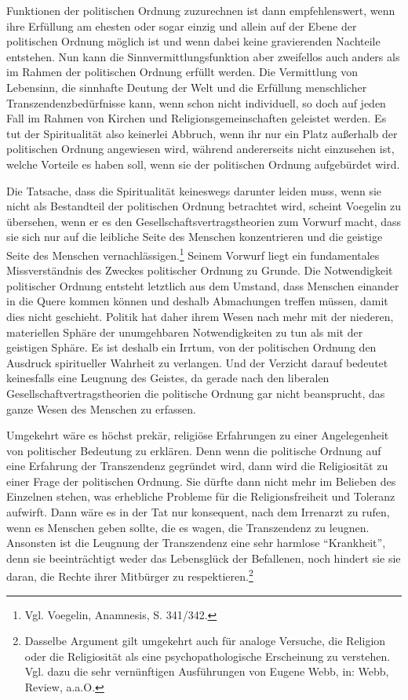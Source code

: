 Funktionen der politischen Ordnung zuzurechnen ist dann empfehlenswert, wenn
ihre Erfüllung am ehesten oder sogar einzig und allein auf der Ebene der
politischen Ordnung möglich ist und wenn dabei keine gravierenden Nachteile
entstehen. Nun kann die Sinnvermittlungsfunktion aber zweifellos auch anders
als im Rahmen der politischen Ordnung erfüllt werden. Die Vermittlung von
Lebensinn, die sinnhafte Deutung der Welt und die Erfüllung menschlicher
Transzendenzbedürfnisse kann, wenn schon nicht individuell, so doch auf jeden
Fall im Rahmen von Kirchen und Religionsgemeinschaften geleistet werden. Es
tut der Spiritualität also keinerlei Abbruch, wenn ihr nur ein Platz außerhalb
der politischen Ordnung angewiesen wird, während andererseits nicht einzusehen
ist, welche Vorteile es haben soll, wenn sie der politischen Ordnung
aufgebürdet wird.

Die Tatsache, dass die Spiritualität keineswegs darunter leiden muss, wenn
sie nicht als Bestandteil der politischen Ordnung betrachtet wird,
scheint Voegelin zu übersehen, wenn er es den
Gesellschaftsvertragstheorien zum Vorwurf macht, dass sie sich nur auf
die leibliche Seite des Menschen konzentrieren und die geistige Seite
des Menschen vernachlässigen.\footnote{Vgl. Voegelin, Anamnesis,
  S. 341/342.} Seinem Vorwurf liegt ein fundamentales Missverständnis des
Zweckes politischer Ordnung zu Grunde. Die Notwendigkeit politischer
Ordnung entsteht letztlich aus dem Umstand, dass Menschen einander in die
Quere kommen können und deshalb Abmachungen treffen müssen, damit dies
nicht geschieht. Politik hat daher ihrem Wesen nach mehr mit der
niederen, materiellen Sphäre der unumgehbaren Notwendigkeiten zu tun als
mit der geistigen Sphäre. Es ist deshalb ein Irrtum, von der politischen
Ordnung den Ausdruck spiritueller Wahrheit zu verlangen.  Und der
Verzicht darauf bedeutet keinesfalls eine Leugnung des Geistes, da
gerade nach den liberalen Gesellschaftvertragstheorien die politische
Ordnung gar nicht beansprucht, das ganze Wesen des Menschen zu erfassen.

Umgekehrt wäre es höchst prekär, religiöse Erfahrungen zu einer Angelegenheit
von politischer Bedeutung zu erklären. Denn wenn die politische Ordnung auf
eine Erfahrung der Transzendenz gegründet wird, dann wird die Religiosität zu
einer Frage der politischen Ordnung. Sie dürfte dann nicht mehr im Belieben
des Einzelnen stehen, was erhebliche Probleme für die Religionsfreiheit und
Toleranz aufwirft. Dann wäre es in der Tat nur konsequent, nach dem Irrenarzt
zu rufen, wenn es Menschen geben sollte, die es wagen, die Transzendenz zu
leugnen.  Ansonsten ist die Leugnung der Transzendenz eine sehr harmlose
"`Krankheit"', denn sie beeinträchtigt weder das Lebensglück der Befallenen,
noch hindert sie sie daran, die Rechte ihrer Mitbürger zu
respektieren.\footnote{Dasselbe Argument gilt umgekehrt auch für analoge
  Versuche, die Religion oder die Religiosität als eine psychopathologische
  Erscheinung zu verstehen. Vgl. dazu die sehr vernünftigen Ausführungen von
  Eugene Webb, in: Webb, Review, a.a.O.}

